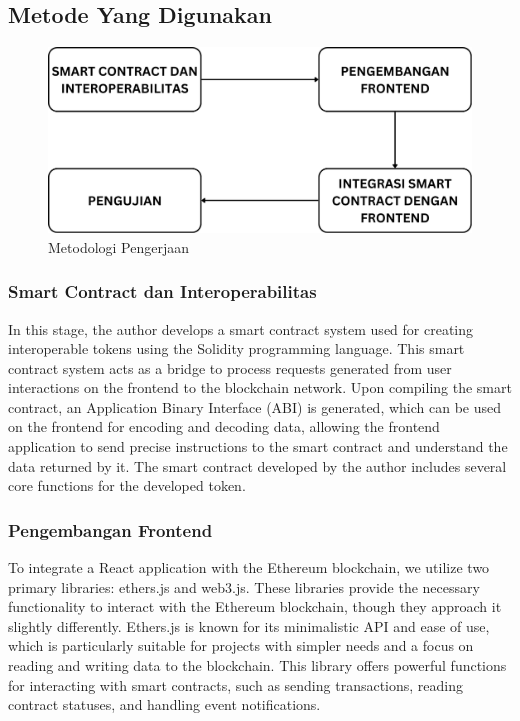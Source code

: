 \subsection{Metode Yang Digunakan}
\begin{figure}[H] \centering
  \includegraphics[scale=0.20]{gambar/metodologi_new.png}
  \caption{Metodologi Pengerjaan}
  \label{fig:metodologi}
\end{figure}

\subsubsection{Smart Contract dan Interoperabilitas}
In this stage, the author develops a smart contract system used for creating interoperable tokens using the Solidity programming language. This smart contract system acts as a bridge to process requests generated from user interactions on the frontend to the blockchain network. Upon compiling the smart contract, an Application Binary Interface (ABI) is generated, which can be used on the frontend for encoding and decoding data, allowing the frontend application to send precise instructions to the smart contract and understand the data returned by it. The smart contract developed by the author includes several core functions for the developed token.

\subsubsection{Pengembangan Frontend} 
To integrate a React application with the Ethereum blockchain, we utilize two primary libraries: ethers.js and web3.js. These libraries provide the necessary functionality to interact with the Ethereum blockchain, though they approach it slightly differently. Ethers.js is known for its minimalistic API and ease of use, which is particularly suitable for projects with simpler needs and a focus on reading and writing data to the blockchain. This library offers powerful functions for interacting with smart contracts, such as sending transactions, reading contract statuses, and handling event notifications.

